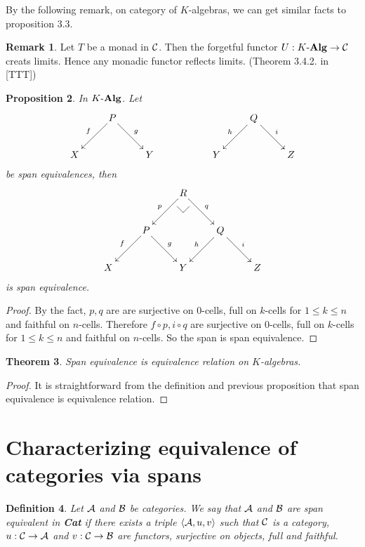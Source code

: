 \documentclass[12pt]{article}
\makeatletter
\theoremstyle{plain}
\newtheorem{theorem}{Theorem}[section]
\newtheorem{proposition}[theorem]{Proposition}
\newtheorem{definition}[theorem]{Definition}
\theoremstyle{definition}
\newtheorem{remark}[theorem]{Remark}
\newcommand{\pullbackmark}[2]{\save ;p+<.8pc,0pc>:(0,-1)::%
(#1) *{\phantom{Z}} %
;p+(#2)-(0,0) **@{-}%
;p-(#1)+(0,0) *{\phantom{Z}} **@{-} \restore}
\makeatother
\begin{document}
By the following remark, on category of $K$-algebras, we can get similar facts to proposition 3.3.

\begin{remark}
Let $T$ be a monad in ${\cal C}$. Then the forgetful functor $U:K \mathchar`- {\bf Alg} \rightarrow {\cal C}$ creats limits. Hence any monadic functor reflects limits. (Theorem 3.4.2. in [TTT])
\end{remark} 


\begin{proposition}
In $K \mathchar`- {\bf Alg}$. Let
\[ \xymatrix{
 & \ar[ld]_f P \ar[rd]^g &  & & & \ar[ld]_h Q \ar[rd]^i & \\
X & & Y &  & Y & & Z 
} \]
be span equivalences, then
\[ \xymatrix{ 
 & & \ar[ld]_p R \pullbackmark{-1,1}{1,1} \ar[rd]^q & & \\
 & \ar[ld]_f P \ar[rd]^g &  & \ar[ld]_h Q \ar[rd]^i & \\
X & & Y & & Z 
} \]
is span equivalence.
\end{proposition}

\begin{proof}  By the fact, $p,q$ are are surjective on $0$-cells, full on $k$-cells for $1 \leq k \leq n$ and faithful on $n$-cells. Therefore $f \circ p , i \circ q$ are surjective on $0$-cells, full on $k$-cells for $1 \leq k \leq n$ and faithful on $n$-cells. So the span is span equivalence.
\end{proof}

\begin{theorem}
Span equivalence is equivalence relation on $K$-algebras.
\end{theorem}

\begin{proof} It is straightforward from the definition and previous proposition that span equivalence is equivalence relation.\end{proof}


\section{Characterizing equivalence of categories via spans}

\begin{definition}
Let ${\cal A}$ and ${\cal B}$ be categories. We say that ${\cal A}$ and ${\cal B}$ are \emph{span equivalent in {\bf Cat}} if there exists a triple $\langle {\cal A}, u, v \rangle$ such that ${\cal C}$ is a category, $u: {\cal C} \rightarrow {\cal A}$ and $v: {\cal C} \rightarrow {\cal B}$ are functors, surjective on objects, full and faithful.
\end{definition}
\end{document}
